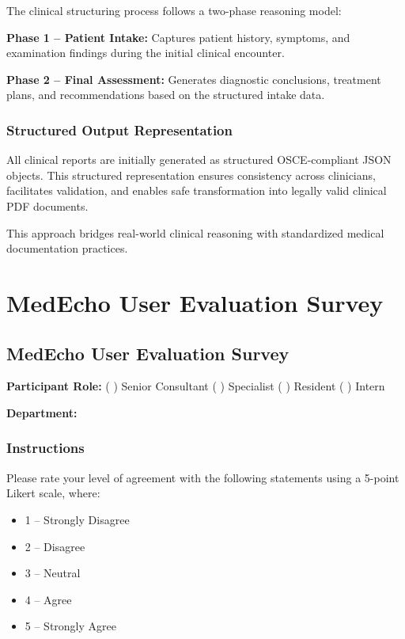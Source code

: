 \documentclass[12pt,a4paper]{report}
\begin{document}
The clinical structuring process follows a two-phase reasoning model:

\textbf{Phase 1 – Patient Intake:}  
Captures patient history, symptoms, and examination findings during the initial clinical encounter.

\textbf{Phase 2 – Final Assessment:}  
Generates diagnostic conclusions, treatment plans, and recommendations based on the structured intake data.

\subsection{Structured Output Representation}

All clinical reports are initially generated as structured OSCE-compliant JSON objects. This structured representation ensures consistency across clinicians, facilitates validation, and enables safe transformation into legally valid clinical PDF documents.

This approach bridges real-world clinical reasoning with standardized medical documentation practices.
\chapter{MedEcho User Evaluation Survey}\label{appendix:survey}
\section{MedEcho User Evaluation Survey}

\textbf{Participant Role:}  
( ) Senior Consultant \quad
( ) Specialist \quad
( ) Resident \quad
( ) Intern

\textbf{Department:} \underline{\hspace{5cm}}

\vspace{0.5cm}

\subsection*{Instructions}
Please rate your level of agreement with the following statements using a 5-point Likert scale, where:

\begin{itemize}
    \item 1 -- Strongly Disagree
    \item 2 -- Disagree
    \item 3 -- Neutral
    \item 4 -- Agree
    \item 5 -- Strongly Agree
\end{itemize}
\end{document}
